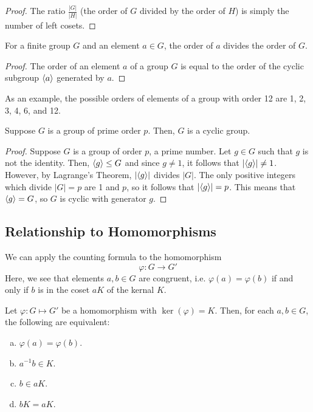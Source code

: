 \documentclass[letterpaper]{article}
\begin{document}
\begin{mdframed}
    \begin{proof}
        The ratio $\frac{|G|}{|H|}$ (the order of $G$ divided by the order of $H$) is simply the number of left cosets. 
    \end{proof}
\end{mdframed}

\begin{corollary}{}{}
    For a finite group $G$ and an element $a \in G$, the order of $a$ divides the order of $G$.
\end{corollary}

\begin{mdframed}
    \begin{proof}
        The order of an element $a$ of a group $G$ is equal to the order of the cyclic subgroup $\langle a \rangle$ generated by $a$. 
    \end{proof}
\end{mdframed}
As an example, the possible orders of elements of a group with order 12 are 1, 2, 3, 4, 6, and 12. 

\begin{corollary}{}{}
    Suppose $G$ is a group of prime order $p$. Then, $G$ is a cyclic group. 
\end{corollary}

\begin{mdframed}
    \begin{proof}
        Suppose $G$ is a group of order $p$, a prime number. Let $g \in G$ such that $g$ is not the identity. Then, $\langle g \rangle \leq G$ and since $g \neq 1$, it follows that $|\langle g \rangle| \neq 1$. However, by Lagrange's Theorem, $|\langle g \rangle|$ divides $|G|$. The only positive integers which divide $|G| = p$ are 1 and $p$, so it follows that $|\langle g \rangle| = p$. This means that $\langle g \rangle = G$, so $G$ is cyclic with generator $g$.  
    \end{proof}
\end{mdframed}

\subsection{Relationship to Homomorphisms}
We can apply the counting formula to the homomorphism
\[\varphi: G \to G'\]
Here, we see that elements $a, b \in G$ are congruent, i.e. $\varphi(a) = \varphi(b)$ if and only if $b$ is in the coset $aK$ of the kernal $K$.
\begin{mdframed}
    \begin{proposition}
        Let $\varphi: G \mapsto G'$ be a homomorphism with $\ker(\varphi) = K$. Then, for each $a, b \in G$, the following are equivalent: 
        \begin{enumerate}[(a)]
            \item $\varphi(a) = \varphi(b)$. 
            \item $a^{-1}b \in K$.
            \item $b \in aK$. 
            \item $bK = aK$. 
        \end{enumerate}
    \end{proposition}
\end{mdframed}
\end{document}
